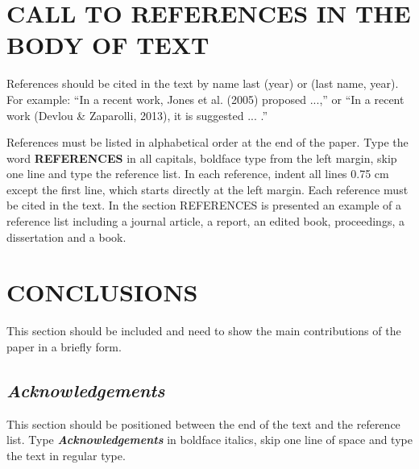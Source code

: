 \documentclass[12pt,fleqn]{article}
\begin{document}
\section{CALL TO REFERENCES IN THE BODY OF TEXT}
References should be cited in the text by name last (year) or (last name, year). For example: ``In a recent work, Jones et al. (2005) proposed ...,'' or ``In a recent work (Devlou \& Zaparolli, 2013), it is suggested ... .''

References must be listed in alphabetical order at the end of the paper. Type the word \textbf{REFERENCES} in all capitals, boldface type from the left margin, skip one line and type the reference list. In each reference, indent all lines 0.75 cm except the first line, which starts directly at the left margin. Each reference must be cited in the text. In the section REFERENCES is presented an example of a reference list including a journal article, a report, an edited book, proceedings, a dissertation and a book.

\section{CONCLUSIONS}
This section should be included and need to show the main contributions of the paper in a briefly form.

\subsection*{\textit{Acknowledgements}}
This section should be positioned between the end of the text and the reference list. Type \textbf{\textit{Acknowledgements}} in boldface italics, skip one line of space and type the text in regular type.
\end{document}
